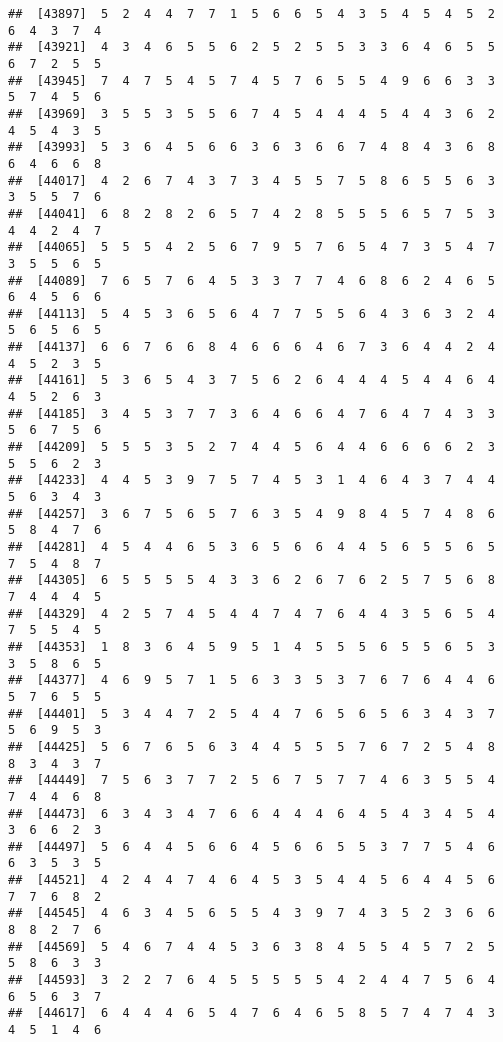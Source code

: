 \documentclass[
]{book}
\begin{document}
\begin{verbatim}
##  [43897]  5  2  4  4  7  7  1  5  6  6  5  4  3  5  4  5  4  5  2  6  4  3  7  4
##  [43921]  4  3  4  6  5  5  6  2  5  2  5  5  3  3  6  4  6  5  5  6  7  2  5  5
##  [43945]  7  4  7  5  4  5  7  4  5  7  6  5  5  4  9  6  6  3  3  5  7  4  5  6
##  [43969]  3  5  5  3  5  5  6  7  4  5  4  4  4  5  4  4  3  6  2  4  5  4  3  5
##  [43993]  5  3  6  4  5  6  6  3  6  3  6  6  7  4  8  4  3  6  8  6  4  6  6  8
##  [44017]  4  2  6  7  4  3  7  3  4  5  5  7  5  8  6  5  5  6  3  3  5  5  7  6
##  [44041]  6  8  2  8  2  6  5  7  4  2  8  5  5  5  6  5  7  5  3  4  4  2  4  7
##  [44065]  5  5  5  4  2  5  6  7  9  5  7  6  5  4  7  3  5  4  7  3  5  5  6  5
##  [44089]  7  6  5  7  6  4  5  3  3  7  7  4  6  8  6  2  4  6  5  6  4  5  6  6
##  [44113]  5  4  5  3  6  5  6  4  7  7  5  5  6  4  3  6  3  2  4  5  6  5  6  5
##  [44137]  6  6  7  6  6  8  4  6  6  6  4  6  7  3  6  4  4  2  4  4  5  2  3  5
##  [44161]  5  3  6  5  4  3  7  5  6  2  6  4  4  4  5  4  4  6  4  4  5  2  6  3
##  [44185]  3  4  5  3  7  7  3  6  4  6  6  4  7  6  4  7  4  3  3  5  6  7  5  6
##  [44209]  5  5  5  3  5  2  7  4  4  5  6  4  4  6  6  6  6  2  3  5  5  6  2  3
##  [44233]  4  4  5  3  9  7  5  7  4  5  3  1  4  6  4  3  7  4  4  5  6  3  4  3
##  [44257]  3  6  7  5  6  5  7  6  3  5  4  9  8  4  5  7  4  8  6  5  8  4  7  6
##  [44281]  4  5  4  4  6  5  3  6  5  6  6  4  4  5  6  5  5  6  5  7  5  4  8  7
##  [44305]  6  5  5  5  5  4  3  3  6  2  6  7  6  2  5  7  5  6  8  7  4  4  4  5
##  [44329]  4  2  5  7  4  5  4  4  7  4  7  6  4  4  3  5  6  5  4  7  5  5  4  5
##  [44353]  1  8  3  6  4  5  9  5  1  4  5  5  5  6  5  5  6  5  3  3  5  8  6  5
##  [44377]  4  6  9  5  7  1  5  6  3  3  5  3  7  6  7  6  4  4  6  5  7  6  5  5
##  [44401]  5  3  4  4  7  2  5  4  4  7  6  5  6  5  6  3  4  3  7  5  6  9  5  3
##  [44425]  5  6  7  6  5  6  3  4  4  5  5  5  7  6  7  2  5  4  8  8  3  4  3  7
##  [44449]  7  5  6  3  7  7  2  5  6  7  5  7  7  4  6  3  5  5  4  7  4  4  6  8
##  [44473]  6  3  4  3  4  7  6  6  4  4  4  6  4  5  4  3  4  5  4  3  6  6  2  3
##  [44497]  5  6  4  4  5  6  6  4  5  6  6  5  5  3  7  7  5  4  6  6  3  5  3  5
##  [44521]  4  2  4  4  7  4  6  4  5  3  5  4  4  5  6  4  4  5  6  7  7  6  8  2
##  [44545]  4  6  3  4  5  6  5  5  4  3  9  7  4  3  5  2  3  6  6  8  8  2  7  6
##  [44569]  5  4  6  7  4  4  5  3  6  3  8  4  5  5  4  5  7  2  5  5  8  6  3  3
##  [44593]  3  2  2  7  6  4  5  5  5  5  5  4  2  4  4  7  5  6  4  6  5  6  3  7
##  [44617]  6  4  4  4  6  5  4  7  6  4  6  5  8  5  7  4  7  4  3  4  5  1  4  6

\end{verbatim}
\end{document}
